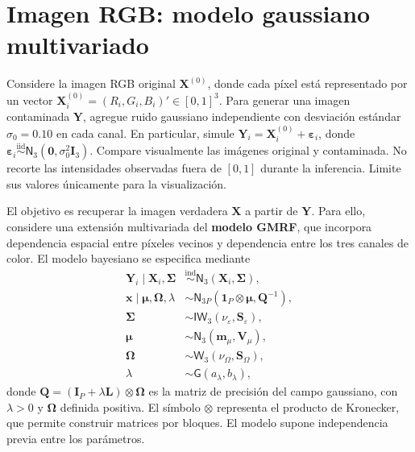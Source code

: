 \documentclass[11pt,a4paper]{article}
\begin{document}
\section{Imagen RGB: modelo gaussiano multivariado}

Considere la imagen RGB original $\boldsymbol{X}^{(0)}$, donde cada píxel está representado por un vector $\boldsymbol{X}_i^{(0)} = (R_i, G_i, B_i)' \in [0, 1]^3$. Para generar una imagen contaminada $\boldsymbol{Y}$, agregue ruido gaussiano independiente con desviación estándar $\sigma_0 = 0.10$ en cada canal. En particular, simule $\boldsymbol{Y}_i = \boldsymbol{X}_i^{(0)} + \boldsymbol{\varepsilon}_i$, donde $\boldsymbol{\varepsilon}_i \overset{\text{iid}}{\sim} \textsf{N}_3(\boldsymbol{0}, \sigma_0^2 \mathbf{I}_3)$. Compare visualmente las imágenes original y contaminada. No recorte las intensidades observadas fuera de $[0, 1]$ durante la inferencia. Limite sus valores únicamente para la visualización.

El objetivo es recuperar la imagen verdadera $\boldsymbol{X}$ a partir de $\boldsymbol{Y}$. Para ello, considere una extensión multivariada del \textbf{modelo GMRF}, que incorpora dependencia espacial entre píxeles vecinos y dependencia entre los tres canales de color. El modelo bayesiano se especifica mediante
\begin{align*}
\boldsymbol{Y}_i \mid \boldsymbol{X}_i, \mathbf{\Sigma} &\overset{\text{ind}}{\sim} \textsf{N}_3(\boldsymbol{X}_i, \mathbf{\Sigma}), \\[6pt]
\boldsymbol{x} \mid \boldsymbol{\mu}, \mathbf{\Omega}, \lambda &\sim \textsf{N}_{3P}\left(\boldsymbol{1}_P \otimes \boldsymbol{\mu}, \mathbf{Q}^{-1}\right), \\[6pt]
\mathbf{\Sigma} &\sim \textsf{IW}_3(\nu_\varepsilon, \mathbf{S}_\varepsilon), \\
\boldsymbol{\mu} &\sim \textsf{N}_3(\boldsymbol{m}_\mu, \mathbf{V}_\mu), \\
\mathbf{\Omega} &\sim \textsf{W}_3(\nu_\Omega, \mathbf{S}_\Omega), \\
\lambda &\sim \textsf{G}(a_\lambda, b_\lambda),
\end{align*}
donde $\mathbf{Q} = (\mathbf{I}_P + \lambda\mathbf{L}) \otimes \mathbf{\Omega}$ es la matriz de precisión del campo gaussiano, con $\lambda > 0$ y $\mathbf{\Omega}$ definida positiva. El símbolo $\otimes$ representa el producto de Kronecker, que permite construir matrices por bloques. El modelo supone independencia previa entre los parámetros.
\end{document}
